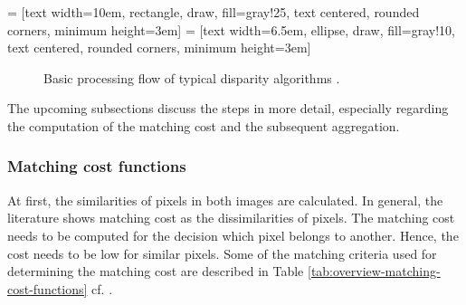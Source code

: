  = [text width=10em, rectangle, draw, fill=gray!25, text centered, rounded corners, minimum height=3em]
 = [text width=6.5em, ellipse, draw, fill=gray!10, text centered, rounded corners, minimum height=3em]
\begin{figure}[h!]
  \centering
  \caption{Basic processing flow of typical disparity algorithms \citep{cyganek2011introduction, scharstein2002taxonomy}.}
  \label{fig:disparity-flow}
\end{figure}

\noindent The upcoming subsections discuss the steps in more detail, especially regarding the computation of the matching cost and the subsequent aggregation.

\newpage

\subsubsection{Matching cost functions}

At first, the similarities of pixels in both images are calculated.
In general, the literature shows matching cost as the dissimilarities of pixels.
The matching cost needs to be computed for the decision which pixel belongs to another.
Hence, the cost needs to be low for similar pixels.
Some of the matching criteria used for determining the matching cost are described in Table \ref{tab:overview-matching-cost-functions} cf. \citep{cyganek2011introduction, scharstein2002taxonomy, opencv_library, kanade1995development, hamzah2010sum}.

